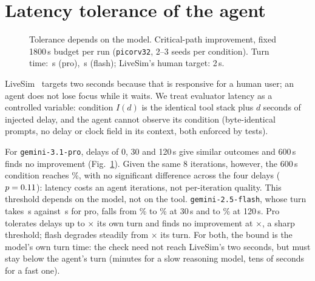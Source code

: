 \documentclass[sigconf,nonacm]{acmart}
\begin{document}
\section{Latency tolerance of the agent}
\label{sec:fast}

\begin{figure}[t]
\centering
{}
\caption{Tolerance depends on the model. Critical-path improvement, fixed
1800\,s budget per run (\texttt{picorv32}, 2--3 seeds per condition). Turn
time: \HProTurn\,s (pro), \HFlashTurn\,s (flash); LiveSim's human target: 2\,s.}
\label{fig:cliff}
\end{figure}

LiveSim~\cite{livesim} targets two seconds because that is responsive for a
human user; an agent does not lose focus while it waits. We treat evaluator
latency as a controlled variable: condition $I(d)$ is the
identical tool stack plus $d$ seconds of injected delay, and the agent cannot
observe its condition (byte-identical prompts, no delay or clock field in its
context, both enforced by tests).

For \texttt{gemini-3.1-pro}, delays of 0, 30 and 120\,s give similar
outcomes and 600\,s finds no improvement (Fig.~\ref{fig:cliff}). Given the same
8 iterations, however, the 600\,s condition reaches \HIsoSixHundred\%, with no
significant difference across the four delays ($p=0.11$): latency costs an
agent iterations, not per-iteration quality. This threshold depends on the
model, not on the tool. \texttt{gemini-2.5-flash}, whose turn takes
\HFlashTurn\,s against \HProTurn\,s for pro, falls from \HFlashZero\% to
\HFlashThirty\% at 30\,s and to \HFlashOneTwenty\% at 120\,s. Pro tolerates
delays up to \HProLoX$\times$ its own turn and finds no improvement at
\HProHiX$\times$, a sharp threshold; flash degrades steadily from
\HFlashLoX$\times$ its turn. For both, the bound is the model's own turn time:
the check need not reach LiveSim's two seconds, but must stay below the
agent's turn (minutes for a slow reasoning model, tens of seconds for a fast
one).
\end{document}
